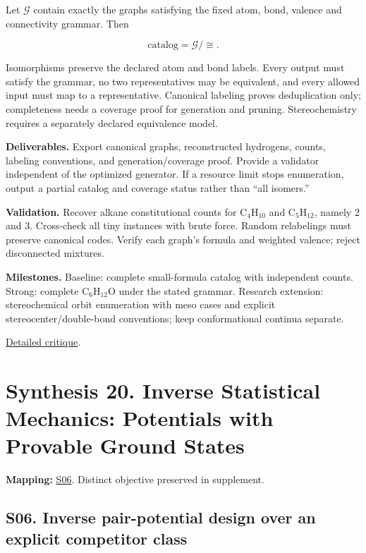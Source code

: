 \documentclass[
  11pt,
]{article}
\begin{document}
Let \(\mathcal G\) contain exactly the graphs satisfying the fixed atom,
bond, valence and connectivity grammar. Then

\[\text{catalog}=\mathcal G/\!\cong.\]

Isomorphisms preserve the declared atom and bond labels. Every output
must satisfy the grammar, no two representatives may be equivalent, and
every allowed input must map to a representative. Canonical labeling
proves deduplication only; completeness needs a coverage proof for
generation and pruning. Stereochemistry requires a separately declared
equivalence model.

\textbf{Deliverables.} Export canonical graphs, reconstructed hydrogens,
counts, labeling conventions, and generation/coverage proof. Provide a
validator independent of the optimized generator. If a resource limit
stops enumeration, output a partial catalog and coverage status rather
than ``all isomers.''

\textbf{Validation.} Recover alkane constitutional counts for
C\ensuremath{{}_{4}}H\ensuremath{{}_{10}} and
C\ensuremath{{}_{5}}H\ensuremath{{}_{12}}, namely 2 and 3. Cross-check
all tiny instances with brute force. Random relabelings must preserve
canonical codes. Verify each graph's formula and weighted valence;
reject disconnected mixtures.

\textbf{Milestones.} Baseline: complete small-formula catalog with
independent counts. Strong: complete
C\ensuremath{{}_{6}}H\ensuremath{{}_{12}}O under the stated grammar.
Research extension: stereochemical orbit enumeration with meso cases and
explicit stereocenter/double-bond conventions; keep conformational
continua separate.

\href{https://github.com/rick-stevens-ai/Pure-Thought/blob/main/reviews/17-Isomer-Enumeration-Molecular-Graphs.md}{Detailed
critique}.

\section{Synthesis 20. Inverse Statistical Mechanics: Potentials with
Provable Ground States}

\textbf{Mapping:}
\href{https://github.com/rick-stevens-ai/Pure-Thought/blob/main/supplemental/S06.md}{S06}.
Distinct objective preserved in supplement.

\subsection{S06. Inverse pair-potential design over an explicit
competitor class}
\end{document}
